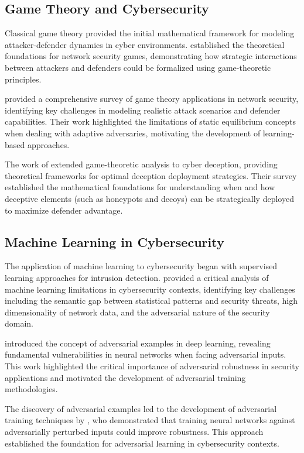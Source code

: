 \subsection{Game Theory and Cybersecurity}

Classical game theory provided the initial mathematical framework for modeling attacker-defender dynamics in cyber environments. \citet{alpcan2010network} established the theoretical foundations for network security games, demonstrating how strategic interactions between attackers and defenders could be formalized using game-theoretic principles.

\citet{roy2010survey} provided a comprehensive survey of game theory applications in network security, identifying key challenges in modeling realistic attack scenarios and defender capabilities. Their work highlighted the limitations of static equilibrium concepts when dealing with adaptive adversaries, motivating the development of learning-based approaches.

The work of \citet{zhu2021survey} extended game-theoretic analysis to cyber deception, providing theoretical frameworks for optimal deception deployment strategies. Their survey established the mathematical foundations for understanding when and how deceptive elements (such as honeypots and decoys) can be strategically deployed to maximize defender advantage.

\subsection{Machine Learning in Cybersecurity}

The application of machine learning to cybersecurity began with supervised learning approaches for intrusion detection. \citet{sommer2010outside} provided a critical analysis of machine learning limitations in cybersecurity contexts, identifying key challenges including the semantic gap between statistical patterns and security threats, high dimensionality of network data, and the adversarial nature of the security domain.

\citet{goodfellow2014explaining} introduced the concept of adversarial examples in deep learning, revealing fundamental vulnerabilities in neural networks when facing adversarial inputs. This work highlighted the critical importance of adversarial robustness in security applications and motivated the development of adversarial training methodologies.

The discovery of adversarial examples led to the development of adversarial training techniques by \citet{madry2017towards}, who demonstrated that training neural networks against adversarially perturbed inputs could improve robustness. This approach established the foundation for adversarial learning in cybersecurity contexts.


